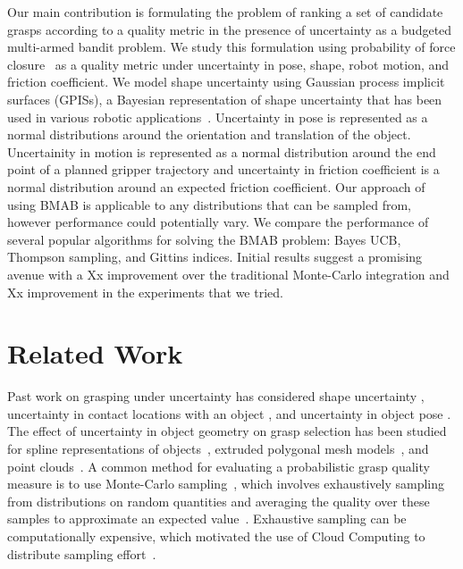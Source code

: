 \documentclass[journal,transmag]{IEEEtran}%
\begin{document}
Our main contribution is formulating the problem of ranking a set of candidate grasps according to a quality metric in the presence of uncertainty as a budgeted multi-armed bandit problem. %
We study this formulation using probability of force closure~\cite{christopoulos2007handling, weisz2012pose, kehoe2012toward} as a quality metric under uncertainty in pose, shape, robot motion, and friction coefficient. 
We model shape uncertainty using Gaussian process implicit surfaces (GPISs), a Bayesian representation of shape uncertainty that has been used in various robotic applications~\cite{dragiev2011, hollinger2013}. 
Uncertainty in pose is represented as a normal distributions around the orientation and translation of the object.
Uncertainity in motion is represented as a normal distribution around the end point of a planned gripper trajectory and uncertainty in friction coefficient is a normal distribution around an expected friction coefficient.
Our approach of using BMAB is applicable to any distributions that can be sampled from, however performance could potentially vary. 
We compare the performance of several popular algorithms for solving the BMAB problem: Bayes UCB, Thompson sampling, and Gittins indices. 
Initial results suggest a promising avenue with a Xx improvement over  the traditional Monte-Carlo integration and Xx improvement in the experiments that we tried. 


\section{Related Work}

Past work on grasping under uncertainty has considered shape uncertainty \cite{goldberg1990bayesian, stulp2011learning}, uncertainty in contact locations with an object \cite{zheng2005}, and uncertainty in object pose \cite{christopoulos2007handling, weisz2012pose, kim2012physically}.
The effect of uncertainty in object geometry on grasp selection has been studied for spline representations of objects~\cite{christopoulos2007handling}, extruded polygonal mesh models~\cite{kehoe2012estimating, kehoe2012toward}, and point clouds~\cite{hsiao2011bayesian}.
A common method for evaluating a probabilistic grasp quality measure is to use Monte-Carlo sampling~\cite{christopoulos2007handling, kehoe2012estimating, kehoe2012toward}, which involves exhaustively sampling from distributions on random quantities and averaging the quality over these samples to approximate an expected value~\cite{caflisch1998monte}.
Exhaustive sampling can be computationally expensive, which motivated the use of Cloud Computing to distribute sampling effort~\cite{kehoe2012toward}.
\end{document}
